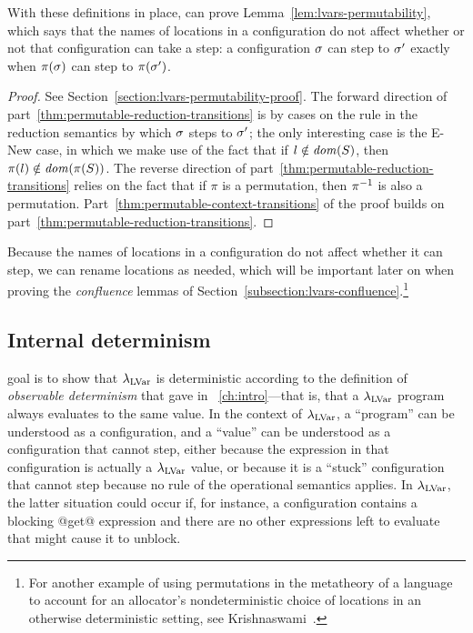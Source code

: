 \LVarsDefPermutationExpression

\LVarsDefPermutationStore

\LVarsDefPermutationConfiguration
\fi

With these definitions in place,  can prove
Lemma~\ref{lem:lvars-permutability}, which says that the names of
locations in a configuration do not affect whether or not that
configuration can take a step: a configuration $\sigma$ can step to
$\sigma'$ exactly when $\pi(\sigma)$ can step to $\pi(\sigma')$.

\LVarsLemPermutability
\ifdefined\DISSERTATION
\begin{proof}
  See Section~\ref{section:lvars-permutability-proof}.  The forward
  direction of part~\ref{thm:permutable-reduction-transitions} is by
  cases on the rule in the reduction semantics by which $\sigma$ steps
  to $\sigma'$; the only interesting case is the {\sc E-New} case, in
  which we make use of the fact that if $l \notin \mathit{dom}(S)$, then
  $\pi(l) \notin \mathit{dom}(\pi(S))$. The reverse direction of
  part~\ref{thm:permutable-reduction-transitions} relies on the fact
  that if $\pi$ is a permutation, then $\pi^{-1}$ is also a permutation.
  Part~\ref{thm:permutable-context-transitions} of the proof builds on
  part~\ref{thm:permutable-reduction-transitions}.
\end{proof}
\fi

\noindent Because the names of locations in a configuration do not affect
whether it can step, we can rename locations as needed, which will be
important later on when proving the \emph{confluence} lemmas of
Section~\ref{subsection:lvars-confluence}.\footnote{For another
  example of using permutations in the metatheory of a language to
  account for an allocator's nondeterministic choice of locations in
  an otherwise deterministic setting, see
  Krishnaswami~.}

\subsection{Internal determinism}

 goal is to show that $\lambda_{\textrm{LVar}}$ is deterministic according to
the definition of \emph{observable determinism} that  gave in
~\ref{ch:intro}---that is, that a $\lambda_{\textrm{LVar}}$ program always
evaluates to the same value.  In the context of $\lambda_{\textrm{LVar}}$, a
``program'' can be understood as a configuration, and a ``value'' can
be understood as a configuration that cannot step, either because the
expression in that configuration is actually a $\lambda_{\textrm{LVar}}$ value, or because it is
a ``stuck'' configuration that cannot step because no rule of the
operational semantics applies.  In $\lambda_{\textrm{LVar}}$, the latter situation
could occur if, for instance, a configuration contains a blocking
@get@ expression and there are no other expressions left to evaluate
that might cause it to unblock.

